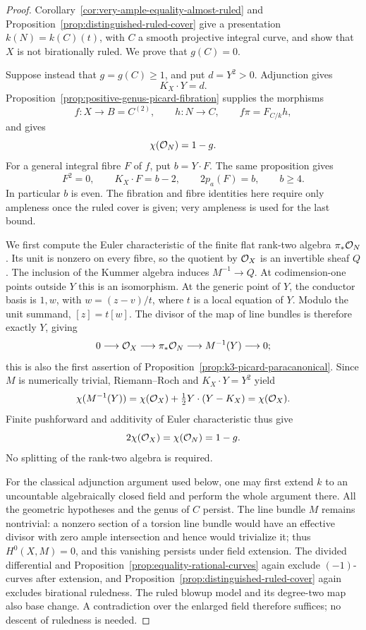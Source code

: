 \begin{proof}
Corollary~\ref{cor:very-ample-equality-almost-ruled} and
Proposition~\ref{prop:distinguished-ruled-cover} give a presentation
$k(N)=k(C)(t)$, with $C$ a smooth projective integral curve, and show
that $X$ is not birationally ruled. We prove that $g(C)=0$.

Suppose instead that $g=g(C)\geq1$, and put $d=Y^2>0$.
Adjunction gives
\[
 K_X\cdot Y=d.
\]
Proposition~\ref{prop:positive-genus-picard-fibration} supplies the
morphisms
\[
 f:X\longrightarrow B=C^{(2)},\qquad h:N\longrightarrow C,
 \qquad f\pi=F_{C/k}h,
\]
and gives
\[
 \chi(\mathcal O_N)=1-g.
\]
For a general integral fibre $F$ of $f$, put $b=Y\cdot F$.
The same proposition gives
\[
 F^2=0,\qquad K_X\cdot F=b-2,\qquad
 2p_a(F)=b,\qquad b\geq4.
\]
In particular $b$ is even. The fibration and fibre identities here
require only ampleness once the ruled cover is given; very ampleness
is used for the last bound.

We first compute the Euler characteristic of the finite flat
rank-two algebra $\pi_*\mathcal O_N$. Its unit is nonzero on every fibre,
so the quotient by $\mathcal O_X$ is an invertible sheaf $Q$.
The inclusion of the Kummer algebra induces $M^{-1}\to Q$.
At codimension-one points outside $Y$ this is an isomorphism.
At the generic point of $Y$, the conductor basis is $1,w$, with
$w=(z-v)/t$, where $t$ is a local equation of $Y$. Modulo the unit
summand, $[z]=t[w]$. The divisor of the map of line bundles is
therefore exactly $Y$, giving
\[
 0\longrightarrow\mathcal O_X\longrightarrow\pi_*\mathcal O_N
 \longrightarrow M^{-1}(Y)\longrightarrow0;
\]
this is also the first assertion of
Proposition~\ref{prop:k3-picard-paracanonical}.
Since $M$ is numerically trivial, Riemann--Roch
\cite[Tag~02UO]{Stacks} and
$K_X\cdot Y=Y^2$ yield
\[
 \chi(M^{-1}(Y))
 =\chi(\mathcal O_X)+\tfrac12Y\cdot(Y-K_X)=\chi(\mathcal O_X).
\]
Finite pushforward and additivity of Euler characteristic thus give
\begin{equation}\label{eq:characteristic-two-cover-euler}
 2\chi(\mathcal O_X)=\chi(\mathcal O_N)=1-g.
\end{equation}
No splitting of the rank-two algebra is required.

For the classical adjunction argument used below, one may first extend
$k$ to an uncountable algebraically closed field and perform the
whole argument there. All the geometric hypotheses and the genus
of $C$ persist. The line bundle $M$ remains nontrivial: a nonzero
section of a torsion line bundle would have an effective divisor
with zero ample intersection and hence would trivialize it;
thus $H^0(X,M)=0$, and this vanishing persists under field extension.
The divided differential and
Proposition~\ref{prop:equality-rational-curves} again exclude
$(-1)$-curves after extension, and
Proposition~\ref{prop:distinguished-ruled-cover} again excludes
birational ruledness. The ruled blowup model and its degree-two
map also base change. A contradiction over the enlarged field
therefore suffices; no descent of ruledness is needed.


\end{proof}
